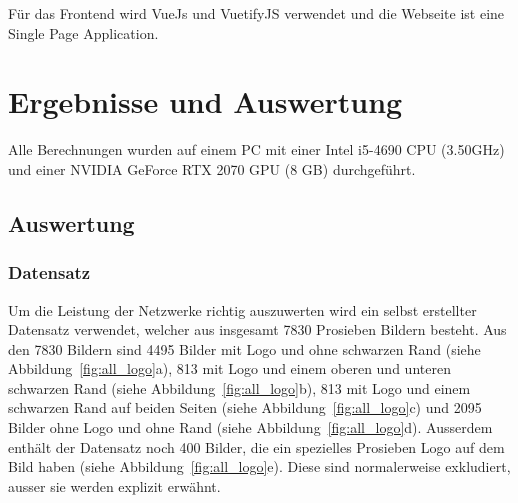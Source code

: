 \documentclass[12pt,a4paper]{report}
\begin{document}
Für das Frontend wird VueJs\cite{vuejs} und VuetifyJS\cite{vuetify} verwendet und die Webseite ist eine Single Page Application.

\chapter{Ergebnisse und Auswertung}\label{ch:ergebnisseUndAuswertung}
Alle Berechnungen wurden auf einem PC mit einer Intel i5-4690 CPU (3.50GHz) und einer NVIDIA GeForce RTX 2070 GPU (8 GB) durchgeführt.
\section{Auswertung}
\subsection{Datensatz}\label{subsec:datensatz}
Um die Leistung der Netzwerke richtig auszuwerten wird ein selbst erstellter Datensatz verwendet,
welcher aus insgesamt 7830 Prosieben Bildern besteht.
Aus den 7830 Bildern sind 4495 Bilder mit Logo und ohne schwarzen Rand (siehe Abbildung~\ref{fig:all_logo}a),
813 mit Logo und einem oberen und unteren schwarzen Rand (siehe Abbildung~\ref{fig:all_logo}b),
813 mit Logo und einem schwarzen Rand auf beiden Seiten (siehe Abbildung~\ref{fig:all_logo}c)
und 2095 Bilder ohne Logo und ohne Rand (siehe Abbildung~\ref{fig:all_logo}d).
Ausserdem enthält der Datensatz noch 400 Bilder, die ein spezielles Prosieben Logo auf dem Bild haben (siehe Abbildung~\ref{fig:all_logo}e).
Diese sind normalerweise exkludiert, ausser sie werden explizit erwähnt.
\end{document}
